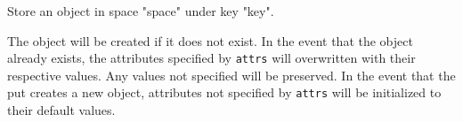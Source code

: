 Store an object in space "space" under key "key".

The object will be created if it does not exist.  In the event that the object
already exists, the attributes specified by \texttt{attrs} will overwritten with
their respective values.  Any values not specified will be preserved.  In the
event that the put creates a new object, attributes not specified by
\texttt{attrs} will be initialized to their default values.




